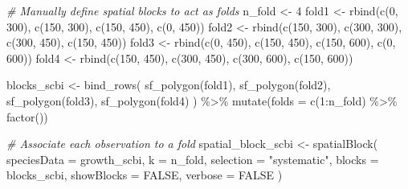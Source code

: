 \documentclass[12pt]{article}
\newenvironment{Shaded}{\begin{snugshade}}{\end{snugshade}}
\newcommand{\AttributeTok}[1]{\textcolor[rgb]{0.77,0.63,0.00}{#1}}
\newcommand{\CommentTok}[1]{\textcolor[rgb]{0.56,0.35,0.01}{\textit{#1}}}
\newcommand{\ConstantTok}[1]{\textcolor[rgb]{0.00,0.00,0.00}{#1}}
\newcommand{\DecValTok}[1]{\textcolor[rgb]{0.00,0.00,0.81}{#1}}
\newcommand{\FunctionTok}[1]{\textcolor[rgb]{0.00,0.00,0.00}{#1}}
\newcommand{\NormalTok}[1]{#1}
\newcommand{\OtherTok}[1]{\textcolor[rgb]{0.56,0.35,0.01}{#1}}
\newcommand{\SpecialCharTok}[1]{\textcolor[rgb]{0.00,0.00,0.00}{#1}}
\newcommand{\StringTok}[1]{\textcolor[rgb]{0.31,0.60,0.02}{#1}}
\begin{document}
\begin{Shaded}
\begin{Highlighting}[]
\CommentTok{\# Manually define spatial blocks to act as folds}
\NormalTok{n\_fold }\OtherTok{\textless{}{-}} \DecValTok{4}
\NormalTok{fold1 }\OtherTok{\textless{}{-}} \FunctionTok{rbind}\NormalTok{(}\FunctionTok{c}\NormalTok{(}\DecValTok{0}\NormalTok{, }\DecValTok{300}\NormalTok{), }\FunctionTok{c}\NormalTok{(}\DecValTok{150}\NormalTok{, }\DecValTok{300}\NormalTok{), }\FunctionTok{c}\NormalTok{(}\DecValTok{150}\NormalTok{, }\DecValTok{450}\NormalTok{), }\FunctionTok{c}\NormalTok{(}\DecValTok{0}\NormalTok{, }\DecValTok{450}\NormalTok{))}
\NormalTok{fold2 }\OtherTok{\textless{}{-}} \FunctionTok{rbind}\NormalTok{(}\FunctionTok{c}\NormalTok{(}\DecValTok{150}\NormalTok{, }\DecValTok{300}\NormalTok{), }\FunctionTok{c}\NormalTok{(}\DecValTok{300}\NormalTok{, }\DecValTok{300}\NormalTok{), }\FunctionTok{c}\NormalTok{(}\DecValTok{300}\NormalTok{, }\DecValTok{450}\NormalTok{), }\FunctionTok{c}\NormalTok{(}\DecValTok{150}\NormalTok{, }\DecValTok{450}\NormalTok{))}
\NormalTok{fold3 }\OtherTok{\textless{}{-}} \FunctionTok{rbind}\NormalTok{(}\FunctionTok{c}\NormalTok{(}\DecValTok{0}\NormalTok{, }\DecValTok{450}\NormalTok{), }\FunctionTok{c}\NormalTok{(}\DecValTok{150}\NormalTok{, }\DecValTok{450}\NormalTok{), }\FunctionTok{c}\NormalTok{(}\DecValTok{150}\NormalTok{, }\DecValTok{600}\NormalTok{), }\FunctionTok{c}\NormalTok{(}\DecValTok{0}\NormalTok{, }\DecValTok{600}\NormalTok{))}
\NormalTok{fold4 }\OtherTok{\textless{}{-}} \FunctionTok{rbind}\NormalTok{(}\FunctionTok{c}\NormalTok{(}\DecValTok{150}\NormalTok{, }\DecValTok{450}\NormalTok{), }\FunctionTok{c}\NormalTok{(}\DecValTok{300}\NormalTok{, }\DecValTok{450}\NormalTok{), }\FunctionTok{c}\NormalTok{(}\DecValTok{300}\NormalTok{, }\DecValTok{600}\NormalTok{), }\FunctionTok{c}\NormalTok{(}\DecValTok{150}\NormalTok{, }\DecValTok{600}\NormalTok{))}

\NormalTok{blocks\_scbi }\OtherTok{\textless{}{-}} \FunctionTok{bind\_rows}\NormalTok{(}
  \FunctionTok{sf\_polygon}\NormalTok{(fold1), }\FunctionTok{sf\_polygon}\NormalTok{(fold2), }\FunctionTok{sf\_polygon}\NormalTok{(fold3), }\FunctionTok{sf\_polygon}\NormalTok{(fold4)}
\NormalTok{) }\SpecialCharTok{\%\textgreater{}\%}
  \FunctionTok{mutate}\NormalTok{(}\AttributeTok{folds =} \FunctionTok{c}\NormalTok{(}\DecValTok{1}\SpecialCharTok{:}\NormalTok{n\_fold) }\SpecialCharTok{\%\textgreater{}\%} \FunctionTok{factor}\NormalTok{())}

\CommentTok{\# Associate each observation to a fold}
\NormalTok{spatial\_block\_scbi }\OtherTok{\textless{}{-}} \FunctionTok{spatialBlock}\NormalTok{(}
  \AttributeTok{speciesData =}\NormalTok{ growth\_scbi, }\AttributeTok{k =}\NormalTok{ n\_fold, }\AttributeTok{selection =} \StringTok{"systematic"}\NormalTok{, }
  \AttributeTok{blocks =}\NormalTok{ blocks\_scbi, }\AttributeTok{showBlocks =} \ConstantTok{FALSE}\NormalTok{, }\AttributeTok{verbose =} \ConstantTok{FALSE}
\NormalTok{)}


\end{Highlighting}
\end{Shaded}
\end{document}
